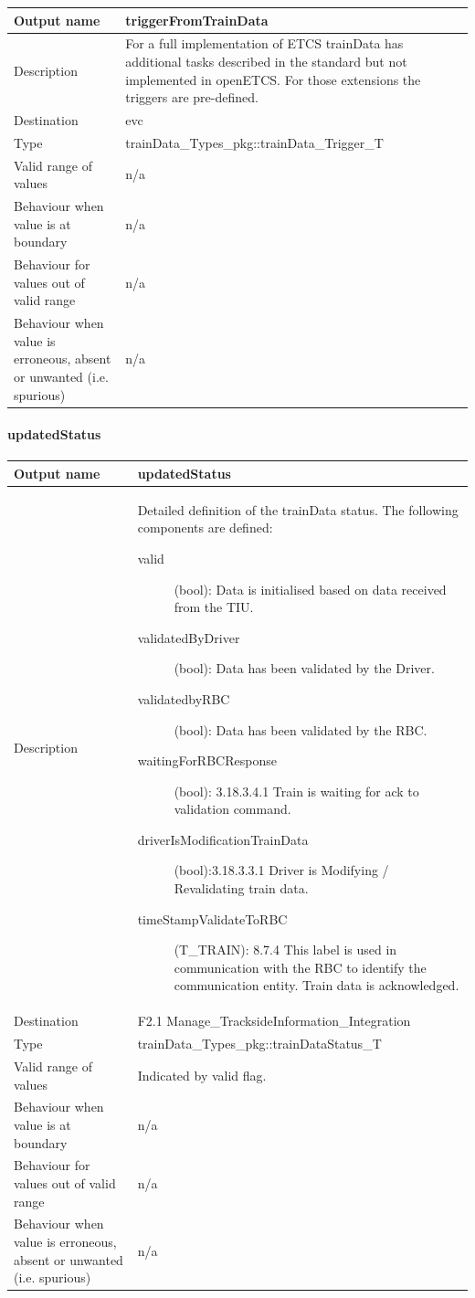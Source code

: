 \begin{longtable}{p{}p{}}
\toprule
Output name				& triggerFromTrainData \\
\midrule
Description				& For a full implementation of ETCS trainData has additional tasks described in the standard but not implemented in openETCS. For those extensions the triggers are pre-defined. \\
\midrule
Destination				& evc \\ 
\midrule
Type					& trainData\_Types\_pkg::trainData\_Trigger\_T
 \\
\midrule
Valid range of values	& n/a \\
\midrule
Behaviour when value is at boundary	& n/a\\
\midrule
Behaviour for values out of valid range	& n/a \\
\midrule
Behaviour when value is erroneous, absent or unwanted (i.e. spurious) & n/a\\
\bottomrule
\end{longtable}

\paragraph{updatedStatus}

\begin{longtable}{p{}p{}}
\toprule
Output name				& updatedStatus \\
\midrule
Description				& Detailed definition of the trainData status. The following components are defined:
\begin{description}
\item[valid](bool): Data is initialised based on data received from the TIU.
\item[validatedByDriver](bool): Data has been validated by the Driver.
\item[validatedbyRBC](bool): Data has been validated by the RBC.
\item[waitingForRBCResponse](bool): 3.18.3.4.1 Train is waiting for ack to validation command.
\item[driverIsModificationTrainData](bool):3.18.3.3.1 Driver is Modifying / Revalidating train data.
\item[timeStampValidateToRBC](T\_TRAIN): 8.7.4 This label is used in communication with the RBC to identify the communication entity. Train data is acknowledged.
\end{description} 
\\
\midrule
Destination				& F2.1 Manage\_TracksideInformation\_Integration\\  
\midrule
Type					& trainData\_Types\_pkg::trainDataStatus\_T \\
\midrule
Valid range of values	& Indicated by valid flag. \\
\midrule
Behaviour when value is at boundary	& n/a\\
\midrule
Behaviour for values out of valid range	& n/a \\
\midrule
Behaviour when value is erroneous, absent or unwanted (i.e. spurious) & n/a\\
\bottomrule
\end{longtable}




